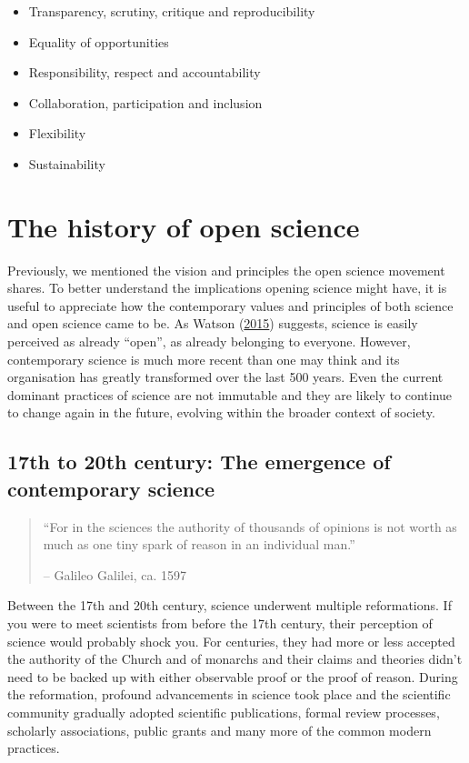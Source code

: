 \documentclass[
]{book}
\begin{document}
\begin{itemize}
\item
  Transparency, scrutiny, critique and reproducibility
\item
  Equality of opportunities
\item
  Responsibility, respect and accountability
\item
  Collaboration, participation and inclusion
\item
  Flexibility
\item
  Sustainability
\end{itemize}

\hypertarget{the-history-of-open-science}{%
\section{The history of open science}\label{the-history-of-open-science}}

Previously, we mentioned the vision and principles the open science movement shares. To better understand the implications opening science might have, it is useful to appreciate how the contemporary values and principles of both science and open science came to be. As Watson (\href{https://genomebiology.biomedcentral.com/articles/10.1186/s13059-015-0669-2}{2015}) suggests, science is easily perceived as already ``open'', as already belonging to everyone. However, contemporary science is much more recent than one may think and its organisation has greatly transformed over the last 500 years. Even the current dominant practices of science are not immutable and they are likely to continue to change again in the future, evolving within the broader context of society.

\hypertarget{th-to-20th-century-the-emergence-of-contemporary-science}{%
\subsection{17th to 20th century: The emergence of contemporary science}\label{th-to-20th-century-the-emergence-of-contemporary-science}}

\begin{quote}
``For in the sciences the authority of thousands of opinions is not worth as much as one tiny spark of reason in an individual man.''

-- Galileo Galilei, ca. 1597
\end{quote}

Between the 17th and 20th century, science underwent multiple reformations. If you were to meet scientists from before the 17th century, their perception of science would probably shock you. For centuries, they had more or less accepted the authority of the Church and of monarchs and their claims and theories didn't need to be backed up with either observable proof or the proof of reason. During the reformation, profound advancements in science took place and the scientific community gradually adopted scientific publications, formal review processes, scholarly associations, public grants and many more of the common modern practices.
\end{document}
